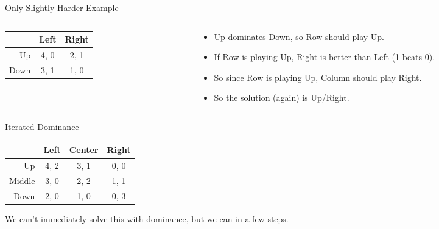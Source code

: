 \documentclass[
  14pt,
  letterpaper,
  ignorenonframetext,
  aspectratio=169,
  handout]{beamer}
\providecommand{\tightlist}{%
  \setlength{\itemsep}{0pt}\setlength{\parskip}{0pt}}\usepackage{longtable,booktabs,array}
\let\olditem\item
\renewcommand{\item}{%
\olditem\vspace{6pt}}
\begin{document}
\begin{frame}{Only Slightly Harder Example}
\protect\hypertarget{only-slightly-harder-example-1}{}
\begin{columns}[T]
\begin{column}{0.4\textwidth}
\begin{table}[!h]
\centering
\begin{tabular}[t]{>{}r|cc}
\toprule
 & Left & Right\\
\midrule
Up & 4, 0 & 2, 1\\
Down & 3, 1 & 1, 0\\
\bottomrule
\end{tabular}
\end{table}
\end{column}

\begin{column}{0.6\textwidth}
\begin{itemize}[<+->]
\tightlist
\item
  Up dominates Down, so Row should play Up.
\item
  If Row is playing Up, Right is better than Left (1 beats 0).
\item
  So since Row is playing Up, Column should play Right.
\item
  So the solution (again) is Up/Right.
\end{itemize}
\end{column}
\end{columns}
\end{frame}

\begin{frame}{Iterated Dominance}
\protect\hypertarget{iterated-dominance}{}
\begin{table}[!h]
\centering
\begin{tabular}[t]{>{}r|ccc}
\toprule
 & Left & Center & Right\\
\midrule
Up & 4, 2 & 3, 1 & 0, 0\\
Middle & 3, 0 & 2, 2 & 1, 1\\
Down & 2, 0 & 1, 0 & 0, 3\\
\bottomrule
\end{tabular}
\end{table}

We can't immediately solve this with dominance, but we can in a few
steps.
\end{frame}
\end{document}

